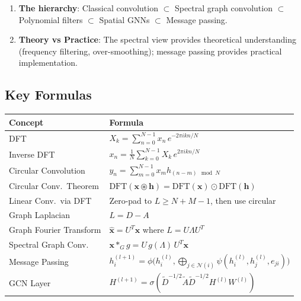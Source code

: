 \begin{notechapter}
\begin{enumerate}
\item \textbf{The hierarchy}: Classical convolution $\subset$ Spectral 
      graph convolution $\subset$ Polynomial filters $\subset$ Spatial 
      GNNs $\subset$ Message passing.

\item \textbf{Theory vs Practice}: The spectral view provides 
      theoretical understanding (frequency filtering, over-smoothing); 
      message passing provides practical implementation.
\end{enumerate}

\subsection{Key Formulas}

\begin{center}
\renewcommand{\arraystretch}{1.6}
\begin{tabular}{ll}
\toprule
\textbf{Concept} & \textbf{Formula} \\
\midrule
DFT & $X_k = \sum_{n=0}^{N-1} x_n \, e^{-2\pi i kn/N}$ \\[0.3em]
Inverse DFT & $x_n = \frac{1}{N} \sum_{k=0}^{N-1} X_k \, 
              e^{2\pi i kn/N}$ \\[0.3em]
Circular Convolution & $y_n = \sum_{m=0}^{N-1} x_m h_{(n-m) \mod N}$ \\[0.3em]
Circular Conv.\ Theorem & $\text{DFT}(\mathbf{x} \circledast \mathbf{h}) 
                         = \text{DFT}(\mathbf{x}) \odot 
                           \text{DFT}(\mathbf{h})$ \\[0.3em]
Linear Conv.\ via DFT & Zero-pad to $L \geq N+M-1$, then use circular \\[0.3em]
Graph Laplacian & $L = D - A$ \\[0.3em]
Graph Fourier Transform & $\hat{\mathbf{x}} = U^T \mathbf{x}$ where 
                          $L = U\Lambda U^T$ \\[0.3em]
Spectral Graph Conv.\ & $\mathbf{x} *_G g 
                        = U \, g(\Lambda) \, U^T \mathbf{x}$ \\[0.3em]
Message Passing & $h_i^{(l+1)} = \phi\bigl( h_i^{(l)}, 
                  \bigoplus_{j \in \mathcal{N}(i)} 
                  \psi(h_i^{(l)}, h_j^{(l)}, e_{ji}) \bigr)$ \\[0.3em]
GCN Layer & $H^{(l+1)} = \sigma(\tilde{D}^{-1/2}\tilde{A}
            \tilde{D}^{-1/2} H^{(l)} W^{(l)})$ \\
\bottomrule
\end{tabular}
\end{center}


\end{notechapter}
